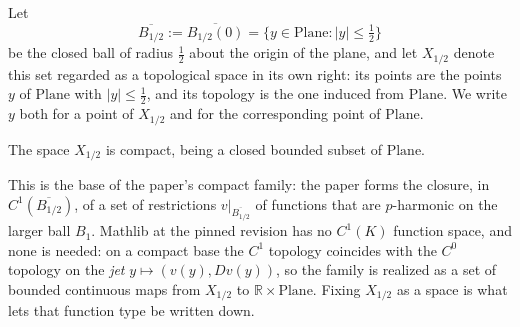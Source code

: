 \begin{definition}
Let
\[
  \overline{B_{1/2}}:=\overline{B_{1/2}(0)}
   =\bigl\{y\in\mathrm{Plane}:\lvert y\rvert\le\tfrac12\bigr\}
\]
be the closed ball of radius $\tfrac12$ about the origin of the plane, and let
$X_{1/2}$ denote this set regarded as a topological space in its own right: its points are the
points $y$ of $\mathrm{Plane}$ with $\lvert y\rvert\le\tfrac12$, and its topology is the one
induced from $\mathrm{Plane}$.  We write $y$ both for a point of $X_{1/2}$ and for the
corresponding point of $\mathrm{Plane}$.

The space $X_{1/2}$ is compact, being a closed bounded subset of $\mathrm{Plane}$.

This is the base of the paper's compact family: the paper forms the closure, in
$C^1(\overline{B_{1/2}})$, of a set of restrictions $v|_{\overline{B_{1/2}}}$ of functions that
are $p$-harmonic on the larger ball $B_1$.  Mathlib at the pinned revision has no
$C^1(K)$ function space, and none is needed: on a compact base the $C^1$ topology coincides
with the $C^0$ topology on the \emph{jet} $y\mapsto(v(y),Dv(y))$, so the family is realized as a
set of bounded continuous maps from $X_{1/2}$ to $\mathbb{R}\times\mathrm{Plane}$.  Fixing
$X_{1/2}$ as a space is what lets that function type be written down.
\end{definition}
